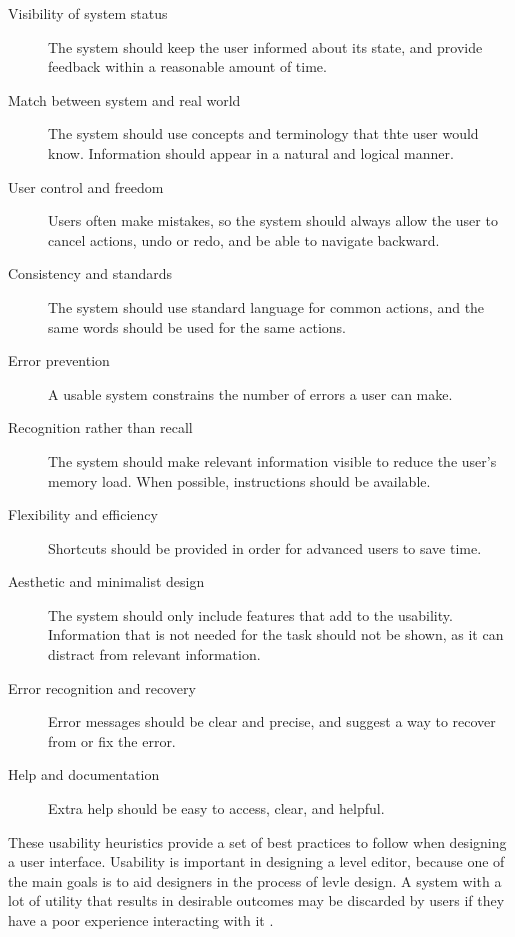 \begin{description}
    \item [Visibility of system status] The system should keep the user informed about its state, and provide feedback within a reasonable amount of time.
    \item [Match between system and real world] The system should use concepts and terminology that thte user would know. Information should appear in a natural and logical manner.
    \item [User control and freedom] Users often make mistakes, so the system should always allow the user to cancel actions, undo or redo, and be able to navigate backward.
    \item [Consistency and standards] The system should use standard language for common actions, and the same words should be used for the same actions.
    \item [Error prevention] A usable system constrains the number of errors a user can make.
    \item [Recognition rather than recall] The system should make relevant information visible to reduce the user's memory load. When possible, instructions should be available.
    \item [Flexibility and efficiency] Shortcuts should be provided in order for advanced users to save time.
    \item [Aesthetic and minimalist design] The system should only include features that add to the usability. Information that is not needed for the task should not be shown, as it can distract from relevant information.
    \item [Error recognition and recovery] Error messages should be clear and precise, and suggest a way to recover from or fix the error.
    \item [Help and documentation] Extra help should be easy to access, clear, and helpful.
\end{description}

These usability heuristics provide a set of best practices to follow when designing a user
interface. Usability is important in designing a level editor, because one of the main
goals is to aid designers in the process of levle design. A system with a lot of utility that
results in desirable outcomes may be discarded by users if they have a poor experience 
interacting with it \cite[p10]{norman2013}.

